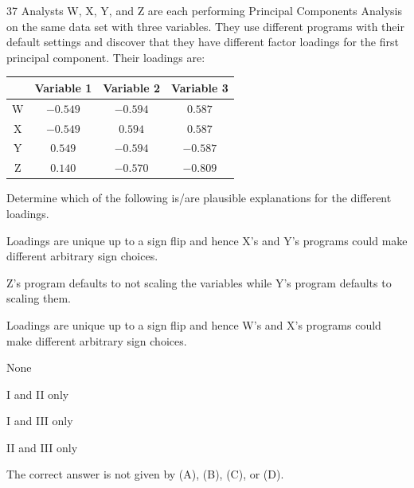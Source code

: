 \begin{question}{37}
Analysts W, X, Y, and Z are each performing Principal Components Analysis on the same data set with three variables. They use different programs with their default settings and discover that they have different factor loadings for the first principal component. Their loadings are:

\begin{center}
\begin{tabular}{|c|c|c|c|}
\hline
 & Variable 1 & Variable 2 & Variable 3 \\ \hline
W & $-0.549$ & $-0.594$ & $0.587$ \\ \hline
X & $-0.549$ & $0.594$ & $0.587$ \\ \hline
Y & $0.549$ & $-0.594$ & $-0.587$ \\ \hline
Z & $0.140$ & $-0.570$ & $-0.809$ \\ \hline
\end{tabular}
\end{center}

Determine which of the following is/are plausible explanations for the different loadings.
\begin{statements}
\item Loadings are unique up to a sign flip and hence X's and Y's programs could make different arbitrary sign choices.
\item Z's program defaults to not scaling the variables while Y's program defaults to scaling them.
\item Loadings are unique up to a sign flip and hence W's and X's programs could make different arbitrary sign choices.
\end{statements}

\begin{choices}
\item None
\item I and II only
\item I and III only
\item II and III only
\item The correct answer is not given by (A), (B), (C), or (D).
\end{choices}
\end{question}

